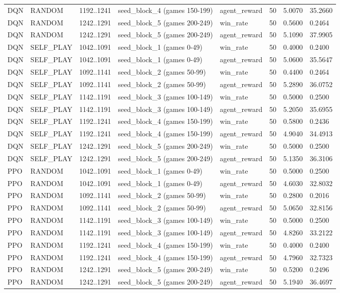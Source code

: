 \begin{table}
\begin{tabular}{llllllll}
DQN & RANDOM & 1192..1241 & seed\_block\_4 (games 150-199) & agent\_reward & 50 & 5.0070 & 35.2660 \\
DQN & RANDOM & 1242..1291 & seed\_block\_5 (games 200-249) & win\_rate & 50 & 0.5600 & 0.2464 \\
DQN & RANDOM & 1242..1291 & seed\_block\_5 (games 200-249) & agent\_reward & 50 & 5.1090 & 37.9905 \\
DQN & SELF\_PLAY & 1042..1091 & seed\_block\_1 (games 0-49) & win\_rate & 50 & 0.4000 & 0.2400 \\
DQN & SELF\_PLAY & 1042..1091 & seed\_block\_1 (games 0-49) & agent\_reward & 50 & 5.0600 & 35.5647 \\
DQN & SELF\_PLAY & 1092..1141 & seed\_block\_2 (games 50-99) & win\_rate & 50 & 0.4400 & 0.2464 \\
DQN & SELF\_PLAY & 1092..1141 & seed\_block\_2 (games 50-99) & agent\_reward & 50 & 5.2890 & 36.0752 \\
DQN & SELF\_PLAY & 1142..1191 & seed\_block\_3 (games 100-149) & win\_rate & 50 & 0.5000 & 0.2500 \\
DQN & SELF\_PLAY & 1142..1191 & seed\_block\_3 (games 100-149) & agent\_reward & 50 & 5.2050 & 35.6955 \\
DQN & SELF\_PLAY & 1192..1241 & seed\_block\_4 (games 150-199) & win\_rate & 50 & 0.5800 & 0.2436 \\
DQN & SELF\_PLAY & 1192..1241 & seed\_block\_4 (games 150-199) & agent\_reward & 50 & 4.9040 & 34.4913 \\
DQN & SELF\_PLAY & 1242..1291 & seed\_block\_5 (games 200-249) & win\_rate & 50 & 0.5000 & 0.2500 \\
DQN & SELF\_PLAY & 1242..1291 & seed\_block\_5 (games 200-249) & agent\_reward & 50 & 5.1350 & 36.3106 \\
PPO & RANDOM & 1042..1091 & seed\_block\_1 (games 0-49) & win\_rate & 50 & 0.5000 & 0.2500 \\
PPO & RANDOM & 1042..1091 & seed\_block\_1 (games 0-49) & agent\_reward & 50 & 4.6030 & 32.8032 \\
PPO & RANDOM & 1092..1141 & seed\_block\_2 (games 50-99) & win\_rate & 50 & 0.2800 & 0.2016 \\
PPO & RANDOM & 1092..1141 & seed\_block\_2 (games 50-99) & agent\_reward & 50 & 5.0650 & 32.8156 \\
PPO & RANDOM & 1142..1191 & seed\_block\_3 (games 100-149) & win\_rate & 50 & 0.5000 & 0.2500 \\
PPO & RANDOM & 1142..1191 & seed\_block\_3 (games 100-149) & agent\_reward & 50 & 4.8260 & 33.2122 \\
PPO & RANDOM & 1192..1241 & seed\_block\_4 (games 150-199) & win\_rate & 50 & 0.4000 & 0.2400 \\
PPO & RANDOM & 1192..1241 & seed\_block\_4 (games 150-199) & agent\_reward & 50 & 4.7960 & 32.7323 \\
PPO & RANDOM & 1242..1291 & seed\_block\_5 (games 200-249) & win\_rate & 50 & 0.5200 & 0.2496 \\
PPO & RANDOM & 1242..1291 & seed\_block\_5 (games 200-249) & agent\_reward & 50 & 5.1940 & 36.4697 \\
\bottomrule
\end{tabular}
\end{table}
